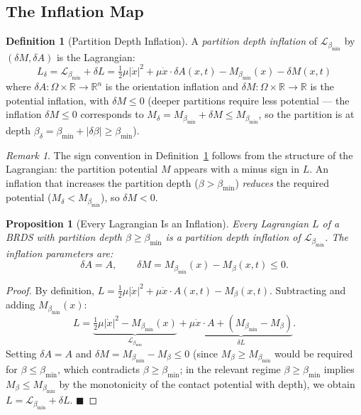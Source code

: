 \documentclass[12pt, a4paper]{article}
\theoremstyle{plain}
\newtheorem{proposition}[theorem]{Proposition}
\theoremstyle{definition}
\newtheorem{definition}[theorem]{Definition}
\theoremstyle{remark}
\newtheorem{remark}[theorem]{Remark}
\newcommand{\bmin}{\beta_{\min}}
\newcommand{\Lmin}{\mathcal{L}_{\bmin}}
\newcommand{\reals}{\mathbb{R}}
\newcommand{\half}{\tfrac{1}{2}}
\newcommand{\qed}{\hfill$\blacksquare$}
\begin{document}
\subsection{The Inflation Map}

\begin{definition}[Partition Depth Inflation]
\label{def:inflation}
A \emph{partition depth inflation} of $\Lmin$ by $(\delta M, \delta A)$ is
the Lagrangian:
\[
  L_{\delta} = \Lmin + \delta L
             = \half\mu|\dot{x}|^2 + \mu\dot{x}\cdot\delta A(x,t)
               - M_{\bmin}(x) - \delta M(x,t)
\]
where $\delta A: \Omega \times \reals \to \reals^n$ is the orientation inflation
and $\delta M: \Omega \times \reals \to \reals$ is the potential inflation, with
$\delta M \leq 0$ (deeper partitions require less potential --- the inflation
$\delta M \leq 0$ corresponds to $M_\delta = M_{\bmin} + \delta M \leq M_{\bmin}$,
so the partition is at depth $\beta_\delta = \bmin + |\delta\beta| \geq \bmin$).
\end{definition}

\begin{remark}
The sign convention in Definition~\ref{def:inflation} follows from the structure
of the Lagrangian: the partition potential $M$ appears with a minus sign in $L$.
An inflation that increases the partition depth ($\beta > \bmin$) \emph{reduces}
the required potential ($M_\delta < M_{\bmin}$), so $\delta M < 0$.
\end{remark}

\begin{proposition}[Every Lagrangian Is an Inflation]
\label{prop:every_inflation}
Every Lagrangian $L$ of a BRDS with partition depth $\beta \geq \bmin$ is a
partition depth inflation of $\Lmin$. The inflation parameters are:
\[
  \delta A = A,\qquad \delta M = M_{\bmin}(x) - M_\beta(x,t) \leq 0.
\]
\end{proposition}

\begin{proof}
By definition, $L = \half\mu|\dot{x}|^2 + \mu\dot{x}\cdot A(x,t) - M_\beta(x,t)$.
Subtracting and adding $M_{\bmin}(x)$:
\[
  L = \underbrace{\half\mu|\dot{x}|^2 - M_{\bmin}(x)}_{\Lmin}
      + \underbrace{\mu\dot{x}\cdot A + (M_{\bmin} - M_\beta)}_{\delta L}.
\]
Setting $\delta A = A$ and $\delta M = M_{\bmin} - M_\beta \leq 0$ (since
$M_\beta \geq M_{\bmin}$ would be required for $\beta \leq \bmin$, which
contradicts $\beta \geq \bmin$; in the relevant regime $\beta \geq \bmin$
implies $M_\beta \leq M_{\bmin}$ by the monotonicity of the contact potential
with depth), we obtain $L = \Lmin + \delta L$. \qed
\end{proof}
\end{document}
